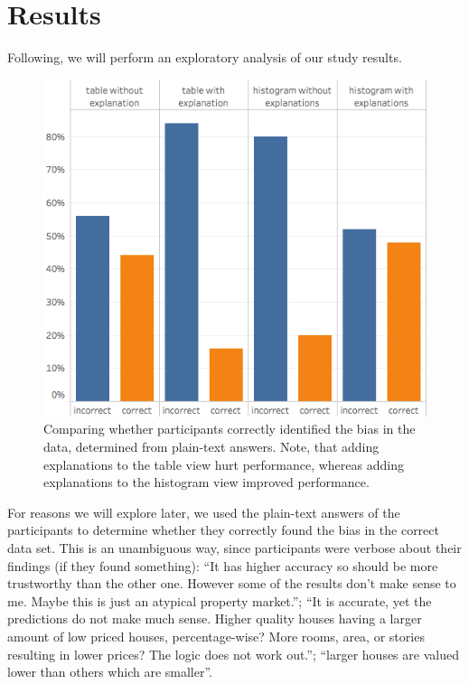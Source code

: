 \section{Results}
\label{sec:results}
Following, we will perform an exploratory analysis of our study results.

\begin{figure}
\centering
\includegraphics[width=0.5\linewidth]{aggexplain/correctness}
\caption{
Comparing whether participants correctly identified the bias in the data, determined from plain-text answers. Note, that adding explanations to the table view hurt performance, whereas adding explanations to the histogram view improved performance.
}
\label{figs:correctness}
\end{figure}

For reasons we will explore later, we used the plain-text answers of the participants to determine whether they correctly found the bias in the correct data set.
This is an unambiguous way, since participants were verbose about their findings (if they found something):
``It has higher accuracy so should be more trustworthy than the other one. However some of the results don't make sense to me. Maybe this is just an atypical property market.'';
``It is accurate, yet the predictions do not make much sense. Higher quality houses having a larger amount of low priced houses, percentage-wise? More rooms, area, or stories resulting in lower prices? The logic does not work out.'';
``larger houses are valued lower than others which are smaller''.


